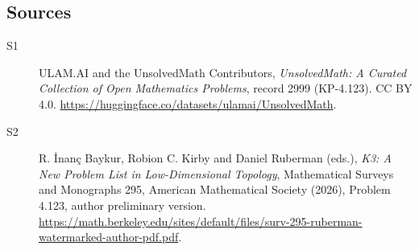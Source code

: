 \documentclass[11pt]{article}
\begin{document}
\subsection{Sources}
\begin{description}
\item[\hypertarget{source:2999:1}{S1}] ULAM.AI and the UnsolvedMath Contributors, \emph{UnsolvedMath: A Curated Collection of Open Mathematics Problems}, record 2999 (KP-4.123). CC BY 4.0. \url{https://huggingface.co/datasets/ulamai/UnsolvedMath}.
\item[\hypertarget{source:2999:2}{S2}] R. İnanç Baykur, Robion C. Kirby and Daniel Ruberman (eds.), \emph{K3: A New Problem List in Low-Dimensional Topology}, Mathematical Surveys and Monographs 295, American Mathematical Society (2026), Problem 4.123, author preliminary version. \url{https://math.berkeley.edu/sites/default/files/surv-295-ruberman-watermarked-author-pdf.pdf}.
\end{description}
\label{end:2999}
\end{document}
